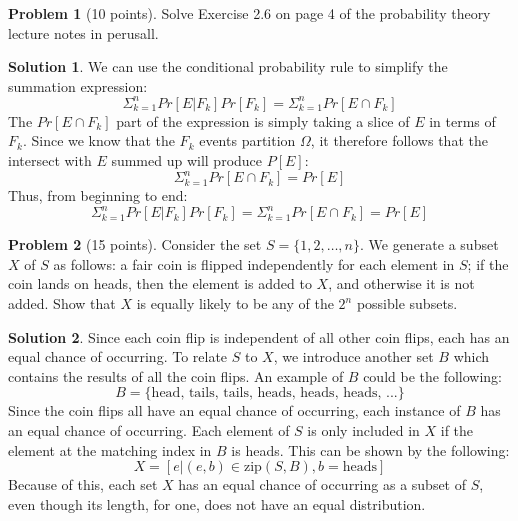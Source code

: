 \documentclass{article}
\theoremstyle{definition}
\newtheorem{problem}{Problem}
\newtheorem*{solution}{Solution}
\begin{document}
\begin{problem}[10 points] 
Solve Exercise 2.6 on page 4 of the probability theory lecture notes
in perusall. 
\end{problem}
\begin{solution}
We can use the conditional probability rule to simplify the summation expression:
$$ \Sigma_{k=1}^n Pr[E | F_k]Pr[F_k] = \Sigma_{k=1}^n Pr[E \cap F_k] $$
The $Pr[E \cap F_k]$ part of the expression is simply taking a slice of $E$ in terms of $F_k$. Since we know that the $F_k$ events partition $\Omega$, it therefore follows that the intersect with $E$ summed up will produce $P[E]$:
$$\Sigma_{k=1}^n Pr[E \cap F_k] = Pr[E] $$
Thus, from beginning to end:
$$ \Sigma_{k=1}^n Pr[E | F_k]Pr[F_k] = \Sigma_{k=1}^n Pr[E \cap F_k] = Pr[E] $$
\end{solution}

\begin{problem}[15 points] Consider the set $S = \{1,2,\ldots, n\}$. We generate
  a subset $X$ of $S$ as follows: a fair coin is flipped independently
  for each element in $S$; if the coin lands on heads, then the
  element is added to $X$, and otherwise it is not added. Show that
  $X$ is equally likely to be any of the $2^n$ possible subsets. 
\end{problem}
\begin{solution}
Since each coin flip is independent of all other coin flips, each has an equal chance of occurring. To relate $S$ to $X$, we introduce another set $B$ which contains the results of all the coin flips. An example of $B$ could be the following:
$$ B = \{\text{head, tails, tails, heads, heads, heads, ...}\} $$
Since the coin flips all have an equal chance of occurring, each instance of $B$ has an equal chance of occurring. Each element of $S$ is only included in $X$ if the element at the matching index in $B$ is heads. This can be shown by the following:
$$ X = [e | (e, b) \in \text{zip}(S, B), b = \text{heads}] $$
Because of this, each set $X$ has an equal chance of occurring as a subset of $S$, even though its length, for one, does not have an equal distribution.
\end{solution}
\end{document}
